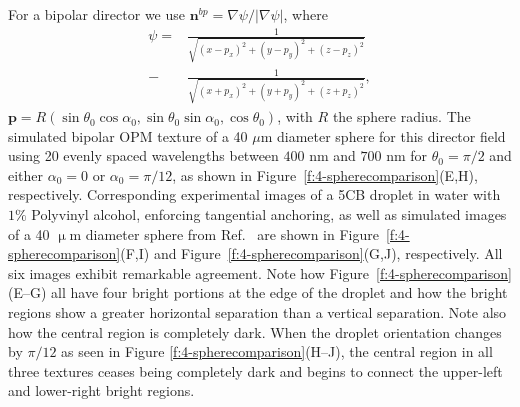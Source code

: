 For a bipolar director we use $\mathbf{n}^{bp} = \nabla \psi/|\nabla \psi|$, where
\begin{align}
\psi =& \frac{1}{\sqrt{(x-p_x)^2+(y-p_y)^2+(z-p_z)^2}} \nonumber \\
      -& \frac{1}{\sqrt{(x+p_x)^2+(y+p_y)^2+(z+p_z)^2}}, \label{e:4-bipolar_pot}
\end{align}
$\mathbf{p} = R(\sin \theta_0\cos\alpha_0,\sin \theta_0\sin\alpha_0,\cos\theta_0) $, with $R$ the sphere radius.
The simulated bipolar OPM texture of a 40 $\mu$m diameter sphere for this director field using 20 evenly spaced wavelengths between $400$ nm and $700$ nm for $\theta_0 = \pi/2$ and either $\alpha_0 = 0$ or $\alpha_0 = \pi/12$, as shown in Figure~\ref{f:4-spherecomparison}(E,H), respectively.
Corresponding experimental images of a 5CB droplet in water with $1\%$ Polyvinyl alcohol, enforcing tangential anchoring, as well as simulated images of a 40 $\upmu$m diameter sphere from Ref.~ are shown in Figure~\ref{f:4-spherecomparison}(F,I) and Figure~\ref{f:4-spherecomparison}(G,J), respectively.
All six images exhibit remarkable agreement.
Note how Figure~\ref{f:4-spherecomparison}(E--G) all have four bright portions at the edge of the droplet and how the bright regions show a greater horizontal separation than a vertical separation.
Note also how the central region is completely dark.
When the droplet orientation changes by $\pi/12$ as seen in Figure \ref{f:4-spherecomparison}(H--J), the central region in all three textures ceases being completely dark and begins to connect the upper-left and lower-right bright regions.

